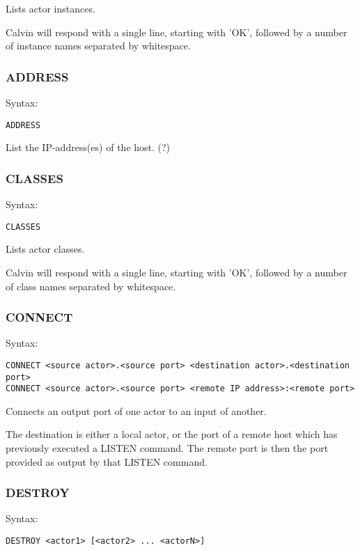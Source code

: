 \documentclass[10pt, a4paper]{article}
\begin{document}
Lists actor instances.

Calvin will respond with a single line, starting with 'OK', followed by a number of instance names separated by whitespace.

\subsubsection*{ADDRESS}

Syntax:
\begin{verbatim}
ADDRESS
\end{verbatim}

List the IP-address(es) of the host. (?)


\subsubsection*{CLASSES}

Syntax:
\begin{verbatim}
CLASSES
\end{verbatim}

Lists actor classes.

Calvin will respond with a single line, starting with 'OK', followed by a number of class names separated by whitespace.

\subsubsection*{CONNECT}

Syntax:
\begin{verbatim}
CONNECT <source actor>.<source port> <destination actor>.<destination port>
CONNECT <source actor>.<source port> <remote IP address>:<remote port>
\end{verbatim}

Connects an output port of one actor to an input of another.

The destination is either a local actor, or the port of a remote host which has previously executed a LISTEN command. The remote port is then the port provided as output by that LISTEN command.

\subsubsection*{DESTROY}

Syntax:
\begin{verbatim}
DESTROY <actor1> [<actor2> ... <actorN>]
\end{verbatim}
\end{document}
